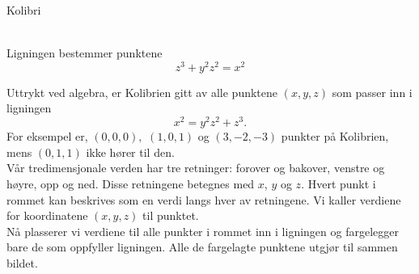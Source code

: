 \documentclass[no]{./../../common/SurferDesc}%
\begin{document}
\footnotesize

\begin{surferPage}
  \begin{surferTitle}Kolibri\end{surferTitle}   \\
Ligningen bestemmer punktene\\
  
  \smallskip
\[z^3+ y^2	z^2	= x^2\]

\singlespacing
Uttrykt ved algebra, er Kolibrien gitt av alle punktene $(x, y, z)$ som passer inn i ligningen
\smallskip
\[ x^2= y^2z^2+z^3.\]
\smallskip
For eksempel er, $(0,0,0),$ $(1,0,1)$ og $(3,-2,-3)$ punkter på Kolibrien, mens $(0,1,1)$ ikke hører til den.\\
 \singlespacing
Vår tredimensjonale verden har tre retninger: forover og bakover, venstre og høyre, opp og ned. Disse retningene betegnes med $x$, $y$ og $z$. Hvert punkt i rommet kan beskrives som en verdi langs hver av retningene. Vi kaller verdiene for koordinatene $(x,y,z)$ til punktet.\\
\singlespacing
Nå plasserer vi verdiene til alle punkter i rommet inn i ligningen og fargelegger bare de som oppfyller ligningen. Alle de fargelagte punktene utgjør til sammen bildet.\\
\singlespacing


  \begin{surferText}
     \end{surferText}
\end{surferPage}
\end{document}

